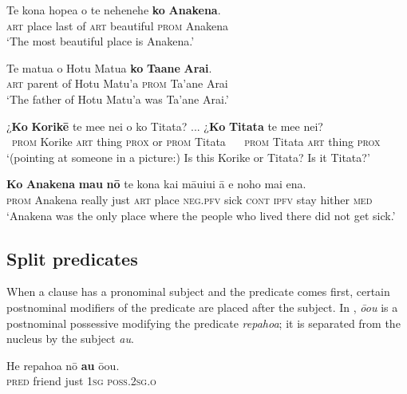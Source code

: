 \ea\label{ex:9.29}
\gll Te kona hope{\ꞌ}a o te nehenehe \textbf{ko} \textbf{{\ꞌ}Anakena}. \\
\textsc{art} place last of \textsc{art} beautiful \textsc{prom} Anakena \\

\glt 
‘The most beautiful place is Anakena.’ \textstyleExampleref{[R350.013]} 
\z

\ea\label{ex:9.30}
\gll Te matu{\ꞌ}a o Hotu Matu{\ꞌ}a \textbf{ko} \textbf{Ta{\ꞌ}ane} \textbf{Arai}. \\
\textsc{art} parent of Hotu Matu’a \textsc{prom} Ta’ane Arai \\

\glt 
‘The father of Hotu Matu’a was Ta’ane Arai.’ \textstyleExampleref{[Ley-2-01.003]}
\z

\ea\label{ex:9.31}
\gll ¿\textbf{Ko} \textbf{Korikē} te me{\ꞌ}e nei {\ꞌ}o ko Titata? ... ¿\textbf{Ko} \textbf{Titata} te me{\ꞌ}e nei? \\
~\textsc{prom} Korike \textsc{art} thing \textsc{prox} or \textsc{prom} Titata  ~ ~\textsc{prom} Titata \textsc{art} thing \textsc{prox} \\

\glt 
‘(pointing at someone in a picture:) Is this Korike or Titata? Is it Titata?’ \textstyleExampleref{[R415.568–572]}
\z

\ea\label{ex:9.32}
\gll \textbf{Ko} \textbf{{\ꞌ}Anakena} \textbf{mau} \textbf{nō} te kona kai māuiui {\ꞌ}ā e noho mai ena. \\
\textsc{prom} Anakena really just \textsc{art} place \textsc{neg.pfv} sick \textsc{cont} \textsc{ipfv} stay hither \textsc{med} \\

\glt 
‘Anakena was the only place where the people who lived there did not get sick.’ \textstyleExampleref{[R231.098]}\textstyleExampleref{} 
\z

\subsection{Split predicates}\label{sec:9.2.5}
When a clause has a pronominal subject and the predicate comes first, certain postnominal modifiers of the predicate are placed after the subject. In , \textit{\mbox{ō{\ꞌ}ou}} is a postnominal possessive modifying the predicate \textit{repahoa}; it is separated from the nucleus by the subject \textit{au}. 

\ea\label{ex:9.33}
\gll He repahoa nō \textbf{au} ō{\ꞌ}ou. \\
\textsc{pred} friend just \textsc{1sg} \textsc{poss.2sg.o} \\


